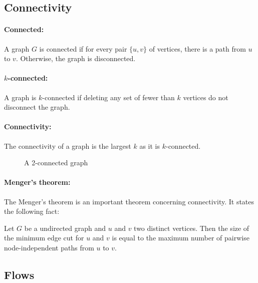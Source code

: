 \subsection{Connectivity}
\paragraph{Connected:}\label{defConnectivity}
A graph $G$ is connected if for every pair $\{u,v\}$ of vertices, there is a 
path from $u$ to $v$. Otherwise, the graph is disconnected.

\paragraph{$k$-connected:}
A graph is $k$-connected if deleting any set of fewer than $k$ vertices do not 
disconnect the graph.

\paragraph{Connectivity:}
The connectivity of a graph is the largest $k$ as it is $k$-connected. 

\begin{figure}[!h]
  \begin{center}
    
  \end{center}
  \caption{A 2-connected graph}
\end{figure}

\paragraph{Menger's theorem:}
The Menger's theorem is an important theorem concerning connectivity.
It states the following fact:

Let $G$ be a undirected graph and $u$ and $v$ two distinct vertices.
Then the size of the minimum edge cut for $u$ and $v$ is equal to the maximum
number of pairwise node-independent paths from $u$ to $v$.



\subsection{Flows}
